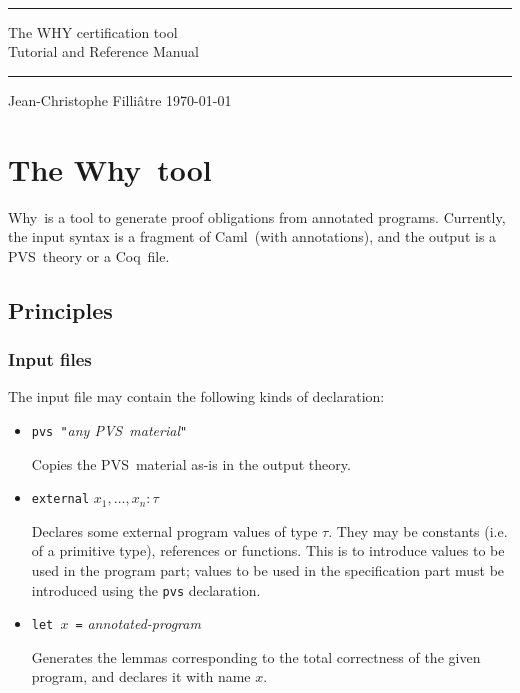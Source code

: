 \documentclass[a4paper,12pt]{report}
\newcommand{\caml}{\textsf{Caml}}
\newcommand{\pvs}{\textsf{PVS}}
\newcommand{\coq}{\textsf{Coq}}
\newcommand{\why}{\textsf{Why}}
\newcommand{\te}[1]{\texttt{#1}}
\begin{document}
\thispagestyle{empty}
\begin{center}
~\\[3cm]
\rule\textwidth{0.1cm}\\[0.5cm]
{\Huge\sf The WHY certification tool}\\[1cm]
{\Large\sf Tutorial and Reference Manual}\\[0.1cm]
\rule\textwidth{0.1cm}\\[3cm]
Jean-Christophe Filli\^atre
\vfill
\today\\
\end{center}

\tableofcontents

\chapter{The \why\ tool}

\why\ is a tool to generate proof obligations from annotated programs.
Currently, the input syntax is a fragment of \caml\ (with annotations),
and the output is a \pvs\ theory or a \coq\ file.


\section{Principles}

\subsection{Input files}

The input file may contain the following kinds of declaration:
\begin{itemize}
  \item \te{pvs "}\textit{any \pvs\ material}\te{"} \par
    Copies the \pvs\ material as-is in the output theory.

  \item \te{external} $x_1,\dots,x_n: \tau$ \par 
    Declares some external program values of type $\tau$.
    They may be constants (i.e. of a primitive type), references 
    or functions. This is to introduce values to be used
    in the program part; values to be used in the specification part
    must be introduced using the \te{pvs} declaration.

  \item \te{let $x$ =} \textit{annotated-program} \par
    Generates the lemmas corresponding to the total correctness of
    the given program, and declares it with name $x$.
\end{itemize}
\end{document}
